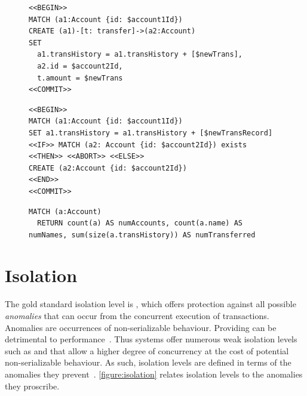 \begin{figure}[htb]
\centering
\begin{minipage}{0.45\linewidth}
\begin{lstlisting}[language=cypher,label=fig:ac,caption=\tx{Atomicity-C Tx.}]
<<BEGIN>>
MATCH (a1:Account {id: $account1Id})
CREATE (a1)-[t: transfer]->(a2:Account)
SET
  a1.transHistory = a1.transHistory + [$newTrans],
  a2.id = $account2Id,
  t.amount = $newTrans
<<COMMIT>>
\end{lstlisting}
\end{minipage}
\quad
\begin{minipage}{0.52\linewidth}
\begin{lstlisting}[language=cypher,label=fig:arb,caption=\tx{Atomicity-RB Tx.}]
<<BEGIN>>
MATCH (a1:Account {id: $account1Id})
SET a1.transHistory = a1.transHistory + [$newTransRecord]
<<IF>> MATCH (a2: Account {id: $account2Id}) exists
<<THEN>> <<ABORT>> <<ELSE>>
CREATE (a2:Account {id: $account2Id})
<<END>>
<<COMMIT>>
\end{lstlisting}
\end{minipage}
\end{figure}


\begin{figure}[htb]
\centering
\begin{lstlisting}[language=cypher,label=fig:acheck,caption=\tx{Atomicity-C/Atomicity-RB:} counting entities in the graph.]
  MATCH (a:Account)
  RETURN count(a) AS numAccounts, count(a.name) AS numNames, sum(size(a.transHistory)) AS numTransferred
\end{lstlisting}
\end{figure}

\section{Isolation}
\label{sec:isolation}

The gold standard isolation level is , which offers 
protection against all possible \emph{anomalies} that can occur from the 
concurrent execution of transactions. Anomalies are occurrences of 
non-serializable behaviour. Providing  can be detrimental
to performance~\cite{DBLP:conf/ds/GrayLPT76}. Thus systems offer numerous weak
isolation levels such as  and  
that allow a higher degree of concurrency at the cost of potential 
non-serializable behaviour. As such, isolation levels are defined in terms of 
the anomalies they prevent~\cite{DBLP:conf/ds/GrayLPT76,DBLP:journals/pvldb/BailisDFGHS13}.
\autoref{figure:isolation} relates isolation levels to the anomalies they proscribe.

